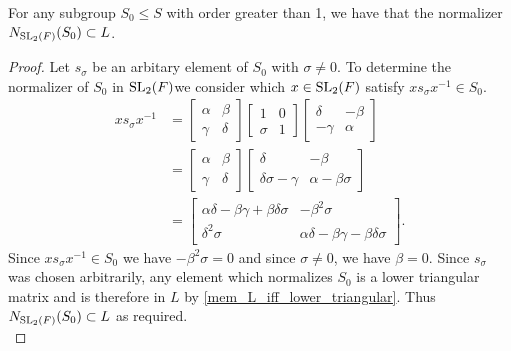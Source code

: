 \begin{proposition}
\label{normalizer_subgroup_S_le_L}
\leanok
 For any subgroup $S_0 \leq S$ with order greater than 1, we have that the normalizer $N_{\operatorname{SL}_2(F)}(S_0) \subset L$.
\end{proposition}
\begin{proof}
    \leanok
Let $s_\sigma$ be an arbitary element of $S_0$ with $\sigma \neq 0$. To determine the normalizer of $S_0$ in $\operatorname{SL}_2(F)$we consider which $x \in \operatorname{SL}_2(F)$ satisfy $x s_\sigma x^{-1} \in S_0$.
\begin{align*} x s_\sigma x^{-1} &= \begin{bmatrix} \alpha & \beta \\ \gamma & \delta \end{bmatrix} \begin{bmatrix} 1 & 0 \\ \sigma & 1 \end{bmatrix} \begin{bmatrix} \delta & - \beta \\ - \gamma & \alpha \end{bmatrix}
\\[1.5ex] &= \begin{bmatrix} \alpha & \beta \\ \gamma & \delta \end{bmatrix} \begin{bmatrix} \delta & - \beta \\ \delta \sigma - \gamma & \alpha - \beta \sigma \end{bmatrix}
\\[1.5ex] &= \begin{bmatrix} \alpha \delta - \beta \gamma + \beta \delta \sigma & - \beta^2  \sigma \\ \delta^2 \sigma & \alpha \delta - \beta \gamma - \beta \delta \sigma \end{bmatrix}.
\end{align*}
Since $x s_\sigma x^{-1} \in S_0$ we have $- \beta^2  \sigma = 0$ and since $\sigma \neq 0$, we have $\beta = 0$. Since $s_\sigma$ was chosen arbitrarily, 
any element which normalizes $S_0$ is a lower triangular matrix and is therefore in $L$ by \ref{mem_L_iff_lower_triangular}. Thus $N_{\operatorname{SL}_2(F)}(S_0) \subset L$ as required. \\
\end{proof}
